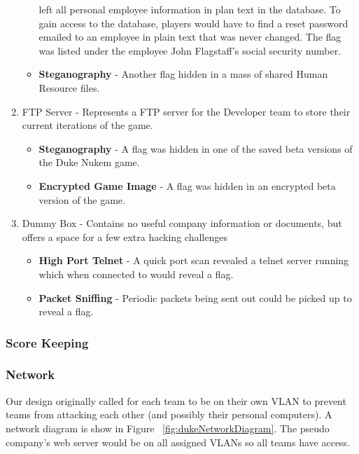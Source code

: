\documentclass[10pt]{article}
\begin{document}
\begin{enumerate}
\begin{itemize}
        left all personal employee information in plan text in the database. To
        gain access to the database, players would have to find a reset password
        emailed to an employee in plain text that was never changed. The flag
        was listed under the employee John Flagstaff's social security number.
        \item \textbf{Steganography} - Another flag hidden in a mass of shared
        Human Resource files.        
      \end{itemize}
  \item FTP Server - Represents a FTP server for the Developer team to store
  their current iterations of the game.
      \begin{itemize}
        \item \textbf{Steganography} - A flag was hidden in one of the saved
        beta versions of the Duke Nukem game.
        \item \textbf{Encrypted Game Image} - A flag was hidden in an encrypted
        beta version of the game.
      \end{itemize}
   \item Dummy Box - Contains no useful company information or documents, but
   offers a space for a few extra hacking challenges
      \begin{itemize}
        \item \textbf{High Port Telnet} - A quick port scan revealed a telnet
        server running which when connected to would reveal a flag.
        \item \textbf{Packet Sniffing} - Periodic packets being sent out
        could be picked up to reveal a flag.
      \end{itemize}
\end{enumerate}

\subsubsection{Score Keeping}

\subsubsection{Network}
Our design originally called for each team to be on their own VLAN to prevent
teams from attacking each other (and possibly their personal computers). A
network diagram is show in Figure ~\ref{fig:dukeNetworkDiagram}. The pseudo
company's web server would be on all assigned VLANs so all teams have access.
\end{document}
